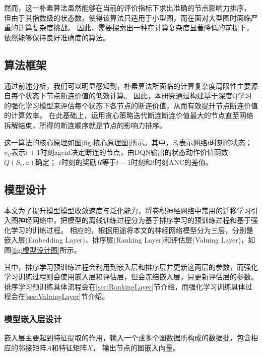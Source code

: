 \documentclass[twocolumn]{morningstar}
\begin{document}
然而，这一朴素算法虽然能够在当前的评价指标下求出准确的节点影响力排序，
但由于其指数级的状态数，使得该算法只适用于小型图，而在面对大型图时面临严重的计算复杂度挑战。
因此，需要探索出一种在计算复杂度显著降低的前提下，依然能够保持良好准确度的算法。

\subsection{算法框架}\label{sec:AlgorithmFramework}



通过前述分析，我们可以明显感知到，朴素算法所面临的计算复杂度局限性主要源自每个状态下节点断连价值的低效计算。
因此，本研究通过构建基于深度Q学习的强化学习模型来评估每个状态下各节点的断连价值，从而有效提升节点断连价值的计算效率。
在此基础上，运用贪心策略迭代断连断连价值最大的节点直至网络拆解结束，所得的断连顺序就是节点的影响力排序。

这一算法的核心原理如图\ref{fig:核心原理图}所示。其中，$S_t$表示网络$t$时刻的状态；
$v_{it}$表示$t+1$时刻agent决定断连的节点，由DQN输出的状态动作价值函数$Q(S_t, a)$确定；
$t$时刻的奖励$R$等于$t-1$时刻和$t$时刻ANC的差值。


\subsection{模型设计}\label{sec:ModelDesign}

本文为了提升模型模型收敛速度与泛化能力，将卷积神经网络中常用的迁移学习引入图神经网络中，把模型的离线训练过程分为基于排序学习的预训练过程和基于强化学习的训练过程。
相应的，根据用途将本文的神经网络模型分为三层，分别是嵌入层(Embedding Layer)、排序层(Ranking Layer)和评估层(Valuing Layer)，如图\ref{fig:模型设计图}所示。



其中，排序学习预训练过程会利用到嵌入层和排序层并更新这两层的参数，而强化学习训练过程则会使用嵌入层和评估层，但会冻结嵌入层，只更新评估层的参数。
排序学习预训练具体流程会在\ref{sec:RankingLayer}节介绍，而强化学习训练具体过程会在\ref{sec:ValuingLayer}节介绍。


\subsubsection{模型嵌入层设计}\label{sec:EmbeddingLayer}



嵌入层主要起到特征提取的作用，输入一个或多个图数据所构成的数据批，包含相应的邻接矩阵$A$和特征矩阵$X$，
输出节点的图嵌入向量。
\end{document}
